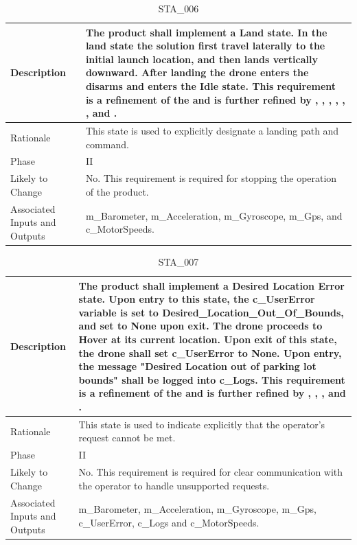 \documentclass{article}
\begin{document}
\begin{table}[!h]
\begin{center}
\caption {STA\_006} 
\label{STA_006}
\begin{tabular}{ | m{3cm} | m{11cm} | }
\hline
Description & The product shall implement a Land state. In the land state the solution first travel laterally to the initial launch location, and then lands vertically downward. After landing the drone enters the disarms and enters the Idle state. This requirement is a refinement of the \nameref{Land State} and is further refined by \nameref{PERF_002}, \nameref{PERF_004}, \nameref{PERF_006}, \nameref{PERF_007}, \nameref{SAFE_001}, \nameref{SAFE_003}, and \nameref{USE_003}. \\
\hline
Rationale & This state is used to explicitly designate a landing path and command. \\
\hline
Phase & II \\
\hline
Likely to Change & No. This requirement is required for stopping the operation of the product. \\
\hline
Associated Inputs and Outputs & m\_Barometer, m\_Acceleration, m\_Gyroscope, m\_Gps, and c\_MotorSpeeds. \\
\hline
\end{tabular}
\end{center}
\end{table}

\begin{table}[!h]
\begin{center}
\caption {STA\_007} 
\label{STA_007}
\begin{tabular}{ | m{3cm} | m{11cm} | }
\hline
Description & The product shall implement a Desired Location Error state. Upon entry to this state, the c\_UserError variable is set to Desired_Location_Out_Of_Bounds, and set to None upon exit. The drone proceeds to Hover at its current location. Upon exit of this state, the drone shall set c\_UserError to None. Upon entry, the message "Desired Location out of parking lot bounds" shall be logged into c\_Logs. This requirement is a refinement of the \nameref{Desired Location Error State} and is further refined by \nameref{PERF_007}, \nameref{SAFE_001}, \nameref{SAFE_003}, and \nameref{USE_003}. \\
\hline
Rationale & This state is used to indicate explicitly that the operator's request cannot be met.  \\
\hline
Phase & II \\
\hline
Likely to Change & No. This requirement is required for clear communication with the operator to handle unsupported requests. \\
\hline
Associated Inputs and Outputs & m\_Barometer, m\_Acceleration, m\_Gyroscope, m\_Gps, c\_UserError, c\_Logs and c\_MotorSpeeds. \\
\hline
\end{tabular}
\end{center}
\end{table}
\end{document}
